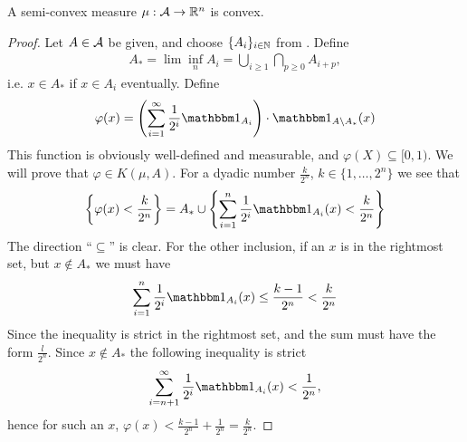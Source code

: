 \documentclass[../../main.tex]{subfiles}
\begin{document}
\begin{lemma}\label{thm: semi-convex implies convex}
A semi-convex measure $\mu:\mathcal{A} \to \mathbb{R}^{n}$ is convex.
\end{lemma}
\begin{proof}
Let $A\in \mathcal{A}$ be given, and choose $\{A_{i}\}_{i\in \mathbb{N}}$ from .
Define
\begin{align*}
	A_{*}=\lim \inf_{n} A_{i} = \bigcup_{i\ge 1} \bigcap_{p\ge 0} A_{i+p},
\end{align*}
i.e. $x\in A_{*}$ if $x\in A_{i}$ eventually. Define
\begin{align*}
	\varphi(x)=\left( \sum_{i=1}^{\infty} \frac{1}{2^{i}}\ind{A_{i}} \right) \cdot \ind{A\setminus A_{*}}(x)
\end{align*}
This function is obviously well-defined and measurable, and $\varphi(X) \subseteq [0,1)$.
We will prove that $\varphi\in K(\mu, A)$. For a dyadic number $\frac{k}{2^{n}}$, $k\in \{1, \dots, 2^{n} \}$ we see that
\begin{align*}
	\left\{ \varphi(x) < \frac{k}{2^{n}} \right\} = A_{*} \cup \left\{ \sum_{i=1}^{n} \frac{1}{2^{i}}\ind{A_{i}}(x) < \frac{k}{2^{n}} \right\}
\end{align*}
The direction ``$\subseteq$'' is clear.
For the other inclusion, if an $x$ is in the rightmost set, but $x\not\in A_{*}$ we must have
\begin{align*}
	\sum_{i=1}^{n}\frac{1}{2^{i}}\ind{A_{i}}(x)\le \frac{k-1}{2^{n}}<\frac{k}{2^{n}}
\end{align*}
Since the inequality is strict in the rightmost set, and the sum must have the form $\frac{l}{2^{n}}$. Since $x\not\in A_{*}$ the following inequality is strict
\begin{align*}
	\sum_{i=n+1}^{\infty} \frac{1}{2^{i}}\ind{A_{i}}(x) < \frac{1}{2^{n}},
\end{align*}
hence for such an $x$, $\varphi(x) < \frac{k-1}{2^{n}}+\frac{1}{2^{n}}=\frac{k}{2^{n}}$.


\end{proof}
\end{document}
